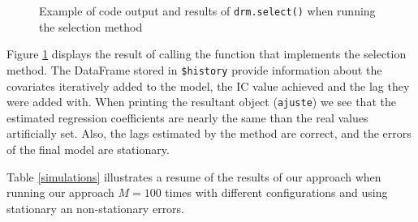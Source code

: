 \documentclass[twoside]{article}
\begin{document}
\begin{figure}
    \caption{Example of code output and results of \texttt{drm.select()} when running the selection method}
    \centering
    \label{simulation.example}
    \vspace{0.3em}
\end{figure}


Figure \ref{simulation.example} displays the result of calling the function that implements the selection method. The DataFrame stored in \texttt{\$history} provide information about the covariates iteratively added to the model, the IC value achieved and the lag they were added with. When printing the resultant object (\texttt{ajuste}) we see that the estimated regression coefficients are nearly the same than the real values artificially set. Also, the lags estimated by the method are correct, and the errors of the final model are stationary.

Table \ref{simulations} illustrates a resume of the results of our approach when running our approach $M=100$ times with different configurations and using stationary an non-stationary errors.
\end{document}
